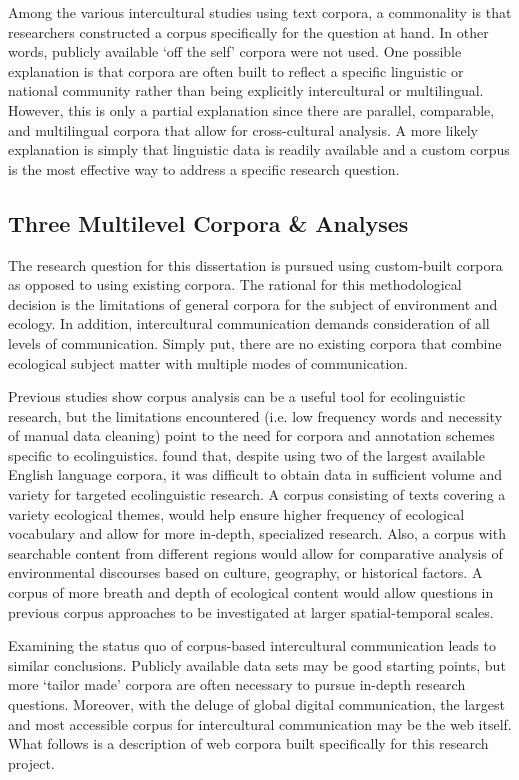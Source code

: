 Among the various intercultural studies using text corpora, a commonality is that researchers constructed a corpus specifically for the question at hand. In other words, publicly available `off the self' corpora were not used. One possible explanation is that corpora are often built to reflect a specific linguistic or national community rather than being explicitly intercultural or multilingual. However, this is only a partial explanation since there are parallel, comparable, and multilingual corpora that allow for cross-cultural analysis. A more likely explanation is simply that linguistic data is readily available and a custom corpus is the most effective way to address a specific research question. 

\subsection{Three Multilevel Corpora \& Analyses}

The research question for this dissertation is pursued using custom-built corpora as opposed to using existing corpora. The rational for this methodological decision is the limitations of general corpora for the subject of environment and ecology. In addition, intercultural communication demands consideration of all levels of communication. Simply put, there are no existing corpora that combine ecological subject matter with multiple modes of communication.  

Previous studies show corpus analysis can be a useful tool for ecolinguistic research, but the limitations encountered (i.e. low frequency words and necessity of manual data cleaning) point to the need for corpora and annotation schemes specific to ecolinguistics. \cite{Frayne2019} found that, despite using two of the largest available English language corpora, it was difficult to obtain data in sufficient volume and variety for targeted ecolinguistic research. A corpus consisting of texts covering a variety ecological themes, would help ensure higher frequency of ecological vocabulary and allow for more in-depth, specialized research. Also, a corpus with searchable content from different regions would allow for comparative analysis of environmental discourses based on culture, geography, or historical factors. A corpus of more breath and depth of ecological content would allow questions in previous corpus approaches to be investigated at larger spatial-temporal scales.

Examining the status quo of corpus-based intercultural communication leads to similar conclusions. Publicly available data sets may be good starting points, but more `tailor made' corpora are often necessary to pursue in-depth research questions. Moreover, with the deluge of global digital communication, the largest and most accessible corpus for intercultural communication may be the web itself. What follows is a description of web corpora built specifically for this research project. 

